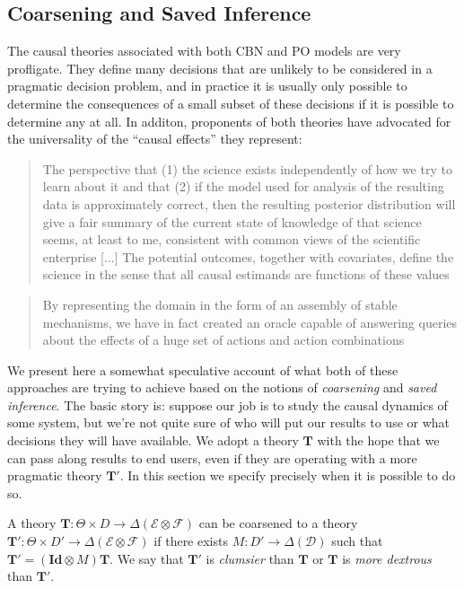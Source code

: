 
\subsection{Coarsening and Saved Inference}

The causal theories associated with both CBN and PO models are very profligate. They define many decisions that are unlikely to be considered in a pragmatic decision problem, and in practice it is usually only possible to determine the consequences of a small subset of these decisions if it is possible to determine any at all. In additon, proponents of both theories have advocated for the universality of the ``causal effects'' they represent:

\begin{quote}
The perspective that (1) the science exists independently of how we try to learn about it and that (2) if the model used for analysis of the resulting data is approximately correct, then the resulting posterior distribution will give a fair summary of the current state of knowledge of that science seems, at least to me, consistent with common views of the scientific enterprise
[...]
The potential outcomes, together with covariates, define the science in the sense that all causal estimands are functions of these values \citep{rubin_causal_2005}
\end{quote}

\begin{quote}
By representing the domain in the form of an assembly of stable mechanisms, we have in fact created an oracle capable of answering queries about the effects of a huge set of actions and action combinations \citep{pearl_causality:_2009}
\end{quote}

We present here a somewhat speculative account of what both of these approaches are trying to achieve based on the notions of \emph{coarsening} and \emph{saved inference}. The basic story is: suppose our job is to study the causal dynamics of some system, but we're not quite sure of who will put our results to use or what decisions they will have available. We adopt a theory $\mathbf{T}$ with the hope that we can pass along results to end users, even if they are operating with a more pragmatic theory $\mathbf{T}'$. In this section we specify precisely when it is possible to do so.

\begin{definition}[Coarsening]
A theory $\mathbf{T}:\Theta\times D\to \Delta(\mathcal{E}\otimes\mathcal{F})$ can be coarsened to a theory $\mathbf{T}':\Theta\times D'\to \Delta(\mathcal{E}\otimes\mathcal{F})$ if there exists $M:D'\to \Delta(\mathcal{D})$ such that $\mathbf{T}'  = (\mathbf{Id} \otimes M) \mathbf{T}$. We say that $\mathbf{T}'$ is \emph{clumsier} than $\mathbf{T}$ or $\mathbf{T}$ is \emph{more dextrous} than $\mathbf{T}'$.
\end{definition}

